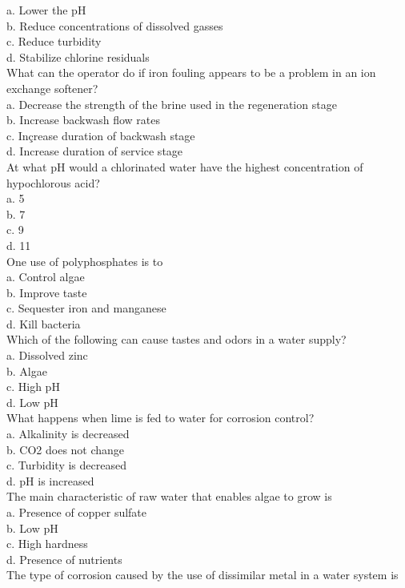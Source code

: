 a. Lower the $\mathrm{pH}$\\
b. Reduce concentrations of dissolved gasses\\
c. Reduce turbidity\\
d. Stabilize chlorine residuals\\
What can the operator do if iron fouling appears to be a problem in an ion exchange softener?\\
a. Decrease the strength of the brine used in the regeneration stage\\
b. Increase backwash flow rates\\
c. Inçrease duration of backwash stage\\
d. Increase duration of service stage\\
  At what $\mathrm{pH}$ would a chlorinated water have the highest concentration of hypochlorous acid?\\
a. 5\\
b. 7\\
c. 9\\
d. 11\\
One use of polyphosphates is to\\
a. Control algae\\
b. Improve taste\\
c. Sequester iron and manganese\\
d. Kill bacteria\\
Which of the following can cause tastes and odors in a water supply?\\
a. Dissolved zinc\\
b. Algae\\
c.  High pH\\
d.  Low pH\\
What happens when lime is fed to water for corrosion control?\\
a. Alkalinity is decreased\\
b. CO2 does not change\\
c. Turbidity is decreased\\
d.  pH is increased\\
The main characteristic of raw water that enables algae to grow is\\
a. Presence of copper sulfate\\
b. Low pH\\
c. High hardness\\
d. Presence of nutrients\\
The type of corrosion caused by the use of dissimilar metal in a water system is\\
